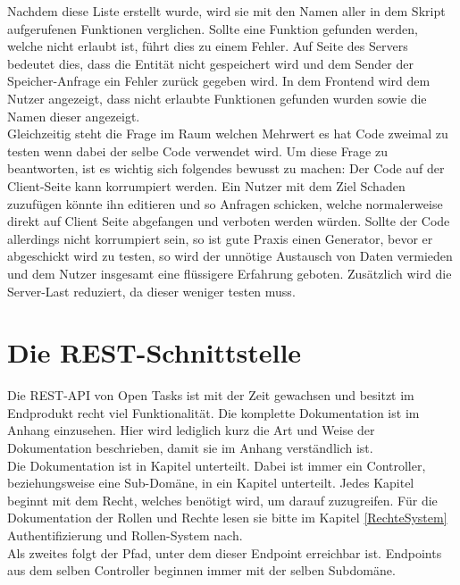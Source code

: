 Nachdem diese Liste erstellt wurde, wird sie mit den Namen aller in dem Skript aufgerufenen Funktionen verglichen. Sollte eine Funktion gefunden werden, welche nicht erlaubt ist, führt dies zu einem Fehler. Auf Seite des Servers bedeutet dies, dass die Entität nicht gespeichert wird und dem Sender der Speicher-Anfrage ein Fehler zurück gegeben wird. In dem Frontend wird dem Nutzer angezeigt, dass nicht erlaubte Funktionen gefunden wurden sowie die Namen dieser angezeigt. \\

Gleichzeitig steht die Frage im Raum welchen Mehrwert es hat Code zweimal zu testen wenn dabei der selbe Code verwendet wird. Um diese Frage zu beantworten, ist es wichtig sich folgendes bewusst zu machen: Der Code auf der Client-Seite kann korrumpiert werden. Ein Nutzer mit dem Ziel Schaden zuzufügen könnte ihn editieren und so Anfragen schicken, welche normalerweise direkt auf Client Seite abgefangen und verboten werden würden. Sollte der Code allerdings nicht korrumpiert sein, so ist gute Praxis einen Generator, bevor er abgeschickt wird zu testen, so wird der unnötige Austausch von Daten vermieden und dem Nutzer insgesamt eine flüssigere Erfahrung geboten. Zusätzlich wird die Server-Last reduziert, da dieser weniger testen muss.


\section{Die REST-Schnittstelle}

Die REST-API von Open Tasks ist mit der Zeit gewachsen und besitzt im Endprodukt recht viel Funktionalität. Die komplette Dokumentation ist im Anhang einzusehen. Hier wird lediglich kurz die Art und Weise der Dokumentation beschrieben, damit sie im Anhang verständlich ist. \\

Die Dokumentation ist in Kapitel unterteilt. Dabei ist immer ein Controller, beziehungsweise eine Sub-Domäne, in ein Kapitel unterteilt. Jedes Kapitel beginnt mit dem Recht, welches benötigt wird, um darauf zuzugreifen. Für die Dokumentation der Rollen und Rechte lesen sie bitte im Kapitel \ref{RechteSystem} Authentifizierung und Rollen-System nach. \\

Als zweites folgt der Pfad, unter dem dieser Endpoint erreichbar ist. Endpoints aus dem selben Controller beginnen immer mit der selben Subdomäne. \\


